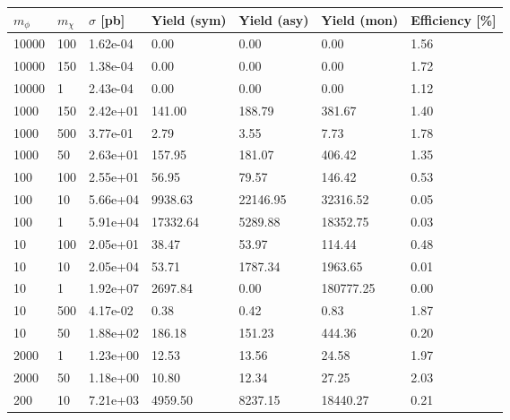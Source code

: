 \begin{table}
\small
\centering
\begin{tabular}{lllllll}
\hline
$m_\phi$ & $m_\chi$ & $\sigma$ [pb] & Yield (sym) & Yield (asy) & Yield (mon) & Efficiency [\%] \\ \hline
10000     &   100       &   1.62e-04  &   0.00      &   0.00      &   0.00      &   1.56      \\ 
10000     &   150       &   1.38e-04  &   0.00      &   0.00      &   0.00      &   1.72      \\ 
10000     &   1         &   2.43e-04  &   0.00      &   0.00      &   0.00      &   1.12      \\ 
1000      &   150       &   2.42e+01  &   141.00    &   188.79    &   381.67    &   1.40      \\ 
1000      &   500       &   3.77e-01  &   2.79      &   3.55      &   7.73      &   1.78      \\ 
1000      &   50        &   2.63e+01  &   157.95    &   181.07    &   406.42    &   1.35      \\ 
100       &   100       &   2.55e+01  &   56.95     &   79.57     &   146.42    &   0.53      \\ 
100       &   10        &   5.66e+04  &   9938.63   &   22146.95  &   32316.52  &   0.05      \\ 
100       &   1         &   5.91e+04  &   17332.64  &   5289.88   &   18352.75  &   0.03      \\ 
10        &   100       &   2.05e+01  &   38.47     &   53.97     &   114.44    &   0.48      \\ 
10        &   10        &   2.05e+04  &   53.71     &   1787.34   &   1963.65   &   0.01      \\ 
10        &   1         &   1.92e+07  &   2697.84   &   0.00      &   180777.25 &   0.00      \\ 
10        &   500       &   4.17e-02  &   0.38      &   0.42      &   0.83      &   1.87      \\ 
10        &   50        &   1.88e+02  &   186.18    &   151.23    &   444.36    &   0.20      \\ 
2000      &   1         &   1.23e+00  &   12.53     &   13.56     &   24.58     &   1.97      \\ 
2000      &   50        &   1.18e+00  &   10.80     &   12.34     &   27.25     &   2.03      \\ 
200       &   10        &   7.21e+03  &   4959.50   &   8237.15   &   18440.27  &   0.21      \\ 

\end{tabular}
\end{table}
